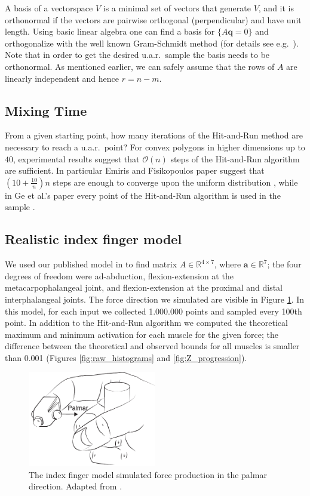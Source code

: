A basis of a vectorspace $V$ is a minimal set of vectors that generate $V$, and it is orthonormal if the vectors are pairwise orthogonal (perpendicular) and have unit length.
Using basic linear algebra one can find a basis for $\{A\textbf{q} = 0\}$ and orthogonalize with the well known Gram-Schmidt method (for details see e.g.\ \cite{Robertson}).
Note that in order to get the desired u.a.r.\ sample the basis needs to be orthonormal.
As mentioned earlier, we can safely assume that the rows of $A$ are linearly independent and hence $r = n-m$.

\subsection{Mixing Time}
\label{sec_lengthrun}
From a given starting point, how many iterations of the Hit-and-Run method are necessary to reach a u.a.r.\ point? For convex polygons in higher dimensions up to $40$, experimental results suggest that $\mathcal{O}(n)$ steps of the Hit-and-Run algorithm are sufficient.
In particular Emiris and Fisikopoulos paper suggest that $(10 + \frac{10}{n})n$ steps are enough to converge upon the uniform distribution \cite{emiris2013efficient}, while in Ge et al.'s paper every point of the Hit-and-Run algorithm is used in the sample \cite{Ge}. 

\subsection{Realistic index finger model}
\label{ss:finger}
We used our published model in \cite{Valero-Cuevas1998Large} to find matrix $A \in \mathbb{R}^{4 \times 7}$, where $\textbf{a} \in \mathbb{R}^7$; the four degrees of freedom were ad-abduction, flexion-extension at the metacarpophalangeal joint, and flexion-extension at the proximal and distal interphalangeal joints.
The force direction we simulated are visible in Figure \ref{fig:finger}.
In this model, for each input we collected 1.000.000 points and sampled every 100th point.
In addition to the Hit-and-Run algorithm we computed the theoretical maximum and minimum activation for each muscle for the given force; the difference between the theoretical and observed bounds for all muscles is smaller than 0.001 (Figures \ref{fig:raw_histograms} and \ref{fig:Z_progression}).

\begin{figure}[htbp]
  \centering
  \includegraphics[width=0.5\textwidth]{sections/figs/finger.pdf}
  \caption{The index finger model simulated force production in the palmar direction. Adapted from \cite{Valero-Cuevas1998Large}.}
  \label{fig:finger}
\end{figure}

